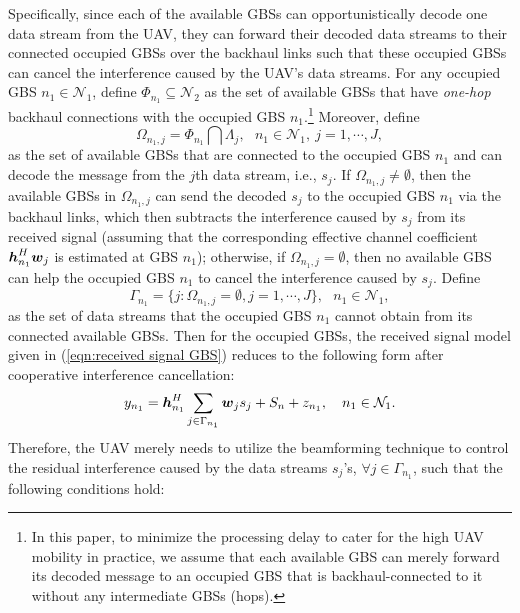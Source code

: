 \documentclass[onecolumn, draftclsnofoot, 12pt]{IEEEtran}
\newcommand{\mv}[1]{\mbox{\boldmath{$ #1 $}}}
\begin{document}
Specifically, since each of the available GBSs can opportunistically decode one data stream from the UAV, they can forward their decoded data streams to their connected occupied GBSs over the backhaul links such that these occupied GBSs can cancel the interference caused by the UAV's data streams. For any occupied GBS $n_1\in \mathcal{N}_1$, define $\Phi_{n_1}\subseteq \mathcal{N}_2$ as the set of available GBSs that have {\it{one-hop}} backhaul connections with the occupied GBS $n_1$.\footnote{In this paper, to minimize the processing delay to cater for the high UAV mobility in practice, we assume that each available GBS can merely forward its decoded message to an occupied GBS that is backhaul-connected to it without any intermediate GBSs (hops).} Moreover, define
\begin{equation}\label{eqn:set of available GBSs with data stream j}
\Omega_{n_1,j}=\Phi_{n_1}\bigcap \Lambda_j, ~~~ n_1\in \mathcal{N}_1, ~ j=1,\cdots,J,
\end{equation}
as the set of available GBSs that are connected to the occupied GBS $n_1$ and can decode the message from the $j$th data stream, i.e., $s_j$. If $\Omega_{n_1,j}\neq \emptyset$, then the available GBSs in $\Omega_{n_1,j}$ can send the decoded $s_j$ to the occupied GBS $n_1$ via the backhaul links, which then subtracts the interference caused by $s_j$ from its received signal (assuming that the corresponding effective channel coefficient ${\mv{h}}_{n_1}^H{\mv{w}}_j$ is estimated at GBS $n_1$); otherwise, if $\Omega_{n_1,j}=\emptyset$, then no available GBS can help the occupied GBS $n_1$ to cancel the interference caused by $s_j$. Define
\begin{equation}\label{eqn:interference data}
\Gamma_{n_1}=\{j:\Omega_{n_1,j}=\emptyset, j=1,\cdots,J\}, ~~~ n_1\in \mathcal{N}_1,
\end{equation}
as the set of data streams that the occupied GBS $n_1$ cannot obtain from its connected available GBSs. Then for the occupied GBSs, the received signal model given in (\ref{eqn:received signal GBS}) reduces to the following form after cooperative interference cancellation:
\begin{align}\label{eqn:received signal GBS interference cancellation}
y_{n_1}=\mv{h}_{n_1}^H\sum\limits_{j\in\Gamma_{n_1}} \mv{w}_js_j+S_n+z_{n_1}, ~~~ n_1\in \mathcal{N}_1.
\end{align}Therefore, the UAV merely needs to utilize the beamforming technique to control the residual interference caused by the data streams $s_j$'s, $\forall j\in \Gamma_{n_1}$, such that the following conditions hold:
\end{document}
